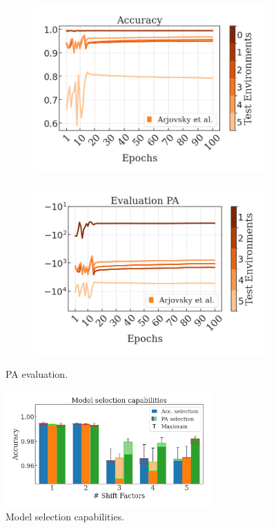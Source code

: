 \begin{figure}[H]
    \begin{subfigure}[b]{0.45\textwidth}
        \centering
        \includegraphics[width=\textwidth]{img/results_discussion/datashift/paper_oracle_all_irm.png}
    \end{subfigure}
    \hfill
    \begin{subfigure}[b]{0.45\textwidth}
        \centering
        \includegraphics[width=\textwidth]{img/results_discussion/datashift/paper_PA_all_irm.png}
    \end{subfigure}

    \caption{PA evaluation.}
    \label{fig:six_figures}
\end{figure}

\begin{figure}
    \centering
    \includegraphics[width=0.7\textwidth]{img/results_discussion/datashift/model_selection.png}
    \caption{Model selection capabilities.}
    \label{fig:model_selection_capabilities}
\end{figure}

